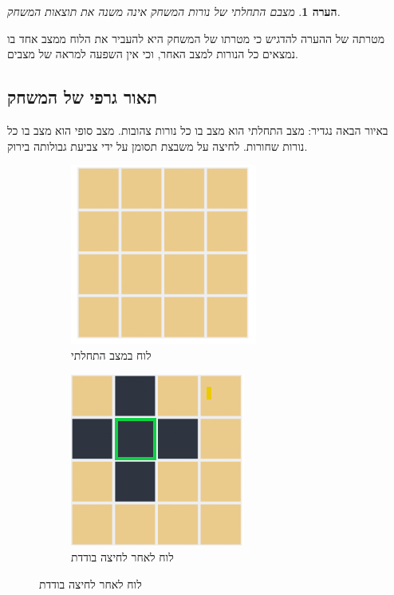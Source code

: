 \documentclass[12pt,leqno]{article}
\theoremstyle{theoremdd}
\newtheorem{comm}{הערה}[section]
\begin{document}
\begin{comm}
מצבם התחלתי של נורות המשחק אינה משנה את תוצאות המשחק.
\end{comm}
מטרתה של ההערה להדגיש כי
מטרתו של המשחק היא להעביר
 את הלוח ממצב אחד בו נמצאים כל הנורות למצב האחר,
 וכי אין השפעה למראה של מצבים.
 
\subsection{תאור גרפי של המשחק}
באיור הבאה נגדיר:
מצב התחלתי הוא מצב בו כל נורות
צהובות.
מצב סופי הוא מצב בו כל נורות שחורות.
לחיצה על משבצת תסומן על ידי צביעת גבולותה בירוק.

\begin{figure}[ht]
    \caption{הסבר שינוי מצב הלוח לאחר לחיצה}
    \centering
    \label{fig: explain game}
    \begin{subfigure}{.3\textwidth}
        \caption{לוח במצב התחלתי}
        \label{subfig: explain game, start}
        \centering
        \includegraphics[scale=0.67]{images/4x4_start_board.PNG}
    \end{subfigure}%
    \begin{subfigure}{.3\textwidth}
        \caption{לוח לאחר לחיצה בודדת}
        \label{subfig: explain game, move}
        \centering
        \includegraphics[scale=0.67]{images/4x4_press.PNG}

\end{subfigure}
\end{figure}
\end{document}

